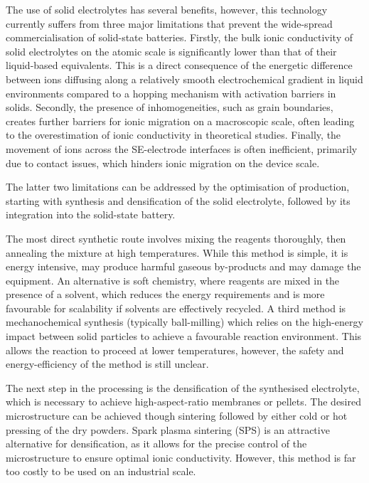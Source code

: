 \documentclass[12pt]{report}
\begin{document}
The use of solid electrolytes has several benefits, however, this technology currently suffers from three major limitations that prevent the wide-spread commercialisation of solid-state batteries. 
Firstly, the bulk ionic conductivity of solid electrolytes on the atomic scale is significantly lower than that of their liquid-based equivalents.
This is a direct consequence of the energetic difference between ions diffusing along a relatively smooth electrochemical gradient in liquid environments compared to a hopping mechanism with activation barriers in solids.
Secondly, the presence of inhomogeneities, such as grain boundaries, creates further barriers for ionic migration on a macroscopic scale, often leading to the overestimation of ionic conductivity in theoretical studies.
Finally, the movement of ions across the SE-electrode interfaces is often inefficient, primarily due to contact issues, which hinders ionic migration on the device scale.

The latter two limitations can be addressed by the optimisation of production, starting with synthesis and densification of the solid electrolyte, followed by its integration into the solid-state battery.

The most direct synthetic route involves mixing the reagents thoroughly, then annealing the mixture at high temperatures.
While this method is simple, it is energy intensive, may produce harmful gaseous by-products and may damage the equipment.
An alternative is soft chemistry, where reagents are mixed in the presence of a solvent, which reduces the energy requirements and is more favourable for scalability if  solvents are effectively recycled.
A third method is mechanochemical synthesis (typically ball-milling) which relies on the high-energy impact between solid particles to achieve a favourable reaction environment.
This allows the reaction to proceed at lower temperatures, however, the safety and energy-efficiency of the method is still unclear.

The next step in the processing is the densification of the synthesised electrolyte, which is necessary to achieve high-aspect-ratio membranes or pellets.
The desired microstructure can be achieved though sintering followed by either cold or hot pressing of the dry powders.
Spark plasma sintering (SPS) is an attractive alternative for densification, as it allows for the precise control of the microstructure to ensure optimal ionic conductivity.
However, this method is far too costly to be used on an industrial scale.
\end{document}
